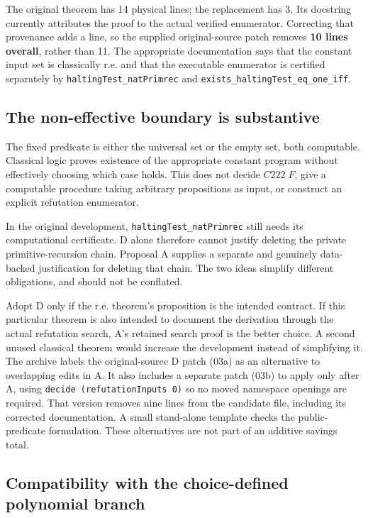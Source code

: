 \documentclass[11pt,a4paper]{article}
\newcommand{\code}[1]{\texttt{\small #1}}
\begin{document}
The original theorem has 14 physical lines; the replacement has 3. Its docstring currently attributes the proof to the actual verified enumerator. Correcting that provenance adds a line, so the supplied original-source patch removes \textbf{10 lines overall}, rather than 11. The appropriate documentation says that the constant input set is classically r.e. and that the executable enumerator is certified separately by \code{haltingTest\_natPrimrec} and \code{exists\_haltingTest\_eq\_one\_iff}.

\subsection{The non-effective boundary is substantive}

The fixed predicate is either the universal set or the empty set, both computable. Classical logic proves existence of the appropriate constant program without effectively choosing which case holds. This does not decide $C222\;F$, give a computable procedure taking arbitrary propositions as input, or construct an explicit refutation enumerator.

In the original development, \code{haltingTest\_natPrimrec} still needs its computational certificate. D alone therefore cannot justify deleting the private primitive-recursion chain. Proposal A supplies a separate and genuinely data-backed justification for deleting that chain. The two ideas simplify different obligations, and should not be conflated.

Adopt D only if the r.e. theorem's proposition is the intended contract. If this particular theorem is also intended to document the derivation through the actual refutation search, A's retained search proof is the better choice. A second unused classical theorem would increase the development instead of simplifying it. The archive labels the original-source D patch (03a) as an alternative to overlapping edits in A. It also includes a separate patch (03b) to apply only after A, using \code{decide (refutationInputs 0)} so no moved namespace openings are required. That version removes nine lines from the candidate file, including its corrected documentation. A small stand-alone template checks the public-predicate formulation. These alternatives are not part of an additive savings total.

\subsection{Compatibility with the choice-defined polynomial branch}
\end{document}
